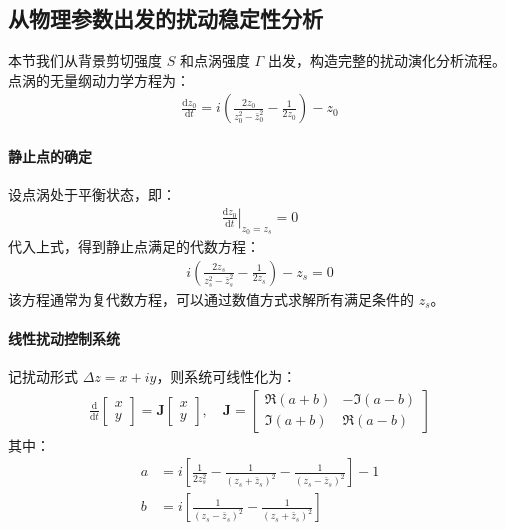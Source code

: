\subsection{从物理参数出发的扰动稳定性分析}

本节我们从背景剪切强度 \( S \) 和点涡强度 \( \Gamma \) 出发，构造完整的扰动演化分析流程。点涡的无量纲动力学方程为：
\begin{align}
    \frac{\mathrm{d}z_0}{\mathrm{d}t} = i\left( \frac{2z_0}{z_0^2 - \bar{z}_0^2} - \frac{1}{2z_0} \right) - z_0
\end{align}

\paragraph{静止点的确定}

设点涡处于平衡状态，即：
\begin{align}
    \left. \frac{\mathrm{d}z_0}{\mathrm{d}t} \right|_{z_0 = z_s} = 0
\end{align}
代入上式，得到静止点满足的代数方程：
\begin{align}
    i\left( \frac{2z_s}{z_s^2 - \bar{z}_s^2} - \frac{1}{2z_s} \right) - z_s = 0
\end{align}
该方程通常为复代数方程，可以通过数值方式求解所有满足条件的 \( z_s \)。

\paragraph{线性扰动控制系统}

记扰动形式 \( \Delta z = x + i y \)，则系统可线性化为：
\begin{align}
    \frac{\mathrm{d}}{\mathrm{d}t}
    \begin{bmatrix}
        x \\ y
    \end{bmatrix}
    =
    \bm{J}
    \begin{bmatrix}
        x \\ y
    \end{bmatrix}, \quad
    \bm{J} =
    \begin{bmatrix}
        \Re(a + b) & -\Im(a - b) \\
        \Im(a + b) & \Re(a - b)
    \end{bmatrix}
\end{align}
其中：
\begin{align*}
    a &= i\left[\frac{1}{2z_s^2} - \frac{1}{(z_s + \bar{z}_s)^2} - \frac{1}{(z_s - \bar{z}_s)^2}\right] - 1 \\
    b &= i\left[\frac{1}{(z_s - \bar{z}_s)^2} - \frac{1}{(z_s + \bar{z}_s)^2} \right]
\end{align*}

